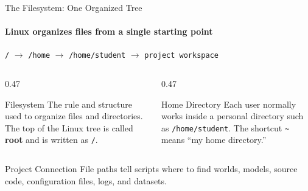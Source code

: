 \begin{frame}{The Filesystem: One Organized Tree}
\framesubtitle{Linux organizes files from a single starting point}

\begin{center}
    \texttt{/} \(\rightarrow\) \texttt{/home} \(\rightarrow\)
    \texttt{/home/student} \(\rightarrow\) \texttt{project workspace}
\end{center}

\pause

\begin{columns}[T,onlytextwidth]
    \begin{column}{0.47\textwidth}
        \begin{block}{Filesystem}
            The rule and structure used to organize files and directories.
            The top of the Linux tree is called \textbf{root} and is written
            as \texttt{/}.
        \end{block}
    \end{column}
    \hfill
    \begin{column}{0.47\textwidth}
        \begin{block}{Home Directory}
            Each user normally works inside a personal directory such as
            \texttt{/home/student}. The shortcut \texttt{\~{}} means
            ``my home directory.''
        \end{block}
    \end{column}
\end{columns}

\begin{exampleblock}{Project Connection}
    File paths tell scripts where to find worlds, models, source code,
    configuration files, logs, and datasets.
\end{exampleblock}
\end{frame}


